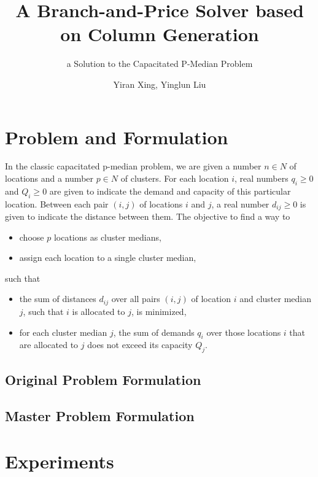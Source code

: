 \documentclass[
	11pt,
	DIV10,
	ngerman,
	a4paper,
	oneside,
	headings=normal,
	captions=tableheading,
	final,
	numbers=noenddot
]{scrartcl}
\title{A Branch-and-Price Solver based on Column Generation}
\subtitle{\vspace{0.5cm}a Solution to the Capacitated P-Median Problem}
\author{Yiran Xing, Yinglun Liu}
\begin{document}
\maketitle


\section{Problem and Formulation}
\label{sec1}

In the classic capacitated p-median problem, we are given a number $ n \in N $ of locations and a number $ p \in N $ of clusters. For each location $ i $, real numbers $ q_{i} \geq 0 $ and $ Q_{i} \geq 0 $ are given to indicate the demand and capacity of this particular location. Between each pair $ \left(i, j\right) $ of locations $ i $ and $ j $, a real number $ d_{ij} \geq 0 $ is given to indicate the distance between them. The objective to find a way to

\begin{itemize}
	\item choose $ p $ locations as cluster medians,
	\item assign each location to a single cluster median,
\end{itemize}

such that

\begin{itemize}
    \item the sum of distances $ d_{ij} $ over all pairs $ \left(i, j\right) $ of location $ i $ and cluster median $ j $, such that $ i $ is allocated to $ j $, is minimized,
    \item for each cluster median $ j $, the sum of demands $ q_{i} $ over those locations $ i $ that are allocated to $ j $ does not exceed its capacity $ Q_{j} $.
\end{itemize}

\subsection{Original Problem Formulation}
\subsection{Master Problem Formulation}


\cite{ceselli2005branch}

\section{Experiments}
\label{sec2}



\end{document}
